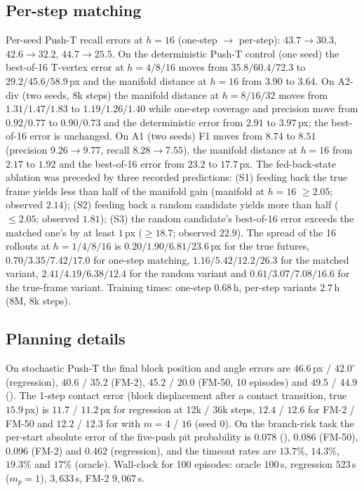 \subsection{Per-step matching}
\label{app:seq}
Per-seed Push-T recall errors at $h{=}16$ (one-step $\to$ per-step): $43.7 \to 30.3$, $42.6 \to 32.2$, $44.7 \to 25.5$. On the deterministic Push-T control (one seed) the best-of-16 T-vertex error at $h = 4 / 8 / 16$ moves from $35.8 / 60.4 / 72.3$ to $29.2 / 45.6 / 58.9$\,px and the manifold distance at $h{=}16$ from $3.90$ to $3.64$. On A2-div (two seeds, 8k steps) the manifold distance at $h = 8 / 16 / 32$ moves from $1.31 / 1.47 / 1.83$ to $1.19 / 1.26 / 1.40$ while one-step coverage and precision move from $0.92 / 0.77$ to $0.90 / 0.73$ and the deterministic error from $2.91$ to $3.97$\,px; the best-of-16 error is unchanged. On A1 (two seeds) F1 moves from $8.74$ to $8.51$ (precision $9.26 \to 9.77$, recall $8.28 \to 7.55$), the manifold distance at $h{=}16$ from $2.17$ to $1.92$ and the best-of-16 error from $23.2$ to $17.7$\,px. The fed-back-state ablation was preceded by three recorded predictions: (S1) feeding back the true frame yields less than half of the manifold gain (manifold at $h{=}16$ $\ge 2.05$; observed $2.14$); (S2) feeding back a random candidate yields more than half ($\le 2.05$; observed $1.81$); (S3) the random candidate's best-of-16 error exceeds the matched one's by at least $1$\,px ($\ge 18.7$; observed $22.9$). The spread of the 16 rollouts at $h = 1 / 4 / 8 / 16$ is $0.20 / 1.90 / 6.81 / 23.6$\,px for the true futures, $0.70 / 3.35 / 7.42 / 17.0$ for one-step matching, $1.16 / 5.42 / 12.2 / 26.3$ for the matched variant, $2.41 / 4.19 / 6.38 / 12.4$ for the random variant and $0.61 / 3.07 / 7.08 / 16.6$ for the true-frame variant. Training times: one-step $0.68$\,h, per-step variants $2.7$\,h (8M, 8k steps).

\subsection{Planning details}
On stochastic Push-T the final block position and angle errors are $46.6$\,px / $42.0^\circ$ (regression), $40.6$ / $35.2$ (FM-2), $45.2$ / $20.0$ (FM-50, 10 episodes) and $49.5$ / $44.9$ (\imlewm{}). The 1-step contact error (block displacement after a contact transition, true $15.9$\,px) is $11.7$ / $11.2$\,px for regression at 12k / 36k steps, $12.4$ / $12.6$ for FM-2 / FM-50 and $12.2$ / $12.3$ for \imlewm{} with $m = 4$ / $16$ (seed 0). On the branch-risk task the per-start absolute error of the five-push pit probability is $0.078$ (\imlewm{}), $0.086$ (FM-50), $0.096$ (FM-2) and $0.462$ (regression), and the timeout rates are $13.7\%$, $14.3\%$, $19.3\%$ and $17\%$ (oracle). Wall-clock for 100 episodes: oracle $100$\,s, regression $523$\,s ($m_p{=}1$), \imlewm{} $3{,}633$\,s, FM-2 $9{,}067$\,s.

